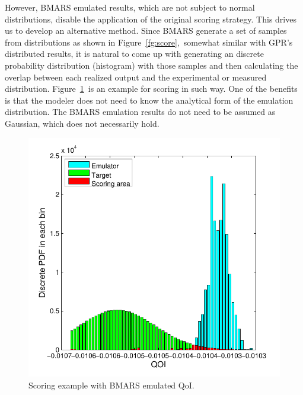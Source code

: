 \documentclass[review]{elsarticle}
\begin{document}
However, BMARS emulated results, which are not subject to normal distributions, disable the application of the original scoring strategy. This drives us to develop an alternative method. Since BMARS generate a set of samples from distributions as shown in Figure~\ref{fg:score},~somewhat similar with GPR's distributed results, it is natural to come up with generating an discrete probability distribution (histogram) with those samples and then calculating the overlap between each realized output and the experimental or measured distribution. Figure~\ref{fg:bmarsscore}~is an example for scoring in such way. One of the benefits is that the modeler does not need to know the analytical form of the emulation distribution. The BMARS emulation results do not need to be assumed as Gaussian, which does not necessarily hold. %
\begin{figure}[ht!]
  \begin{center}
    \includegraphics[width=1\textwidth]{NSE15-48R1_Figure9.pdf}
    \caption[]{\label{fg:bmarsscore}Scoring example with BMARS emulated QoI.}%
  \end{center}
\end{figure}
\end{document}
